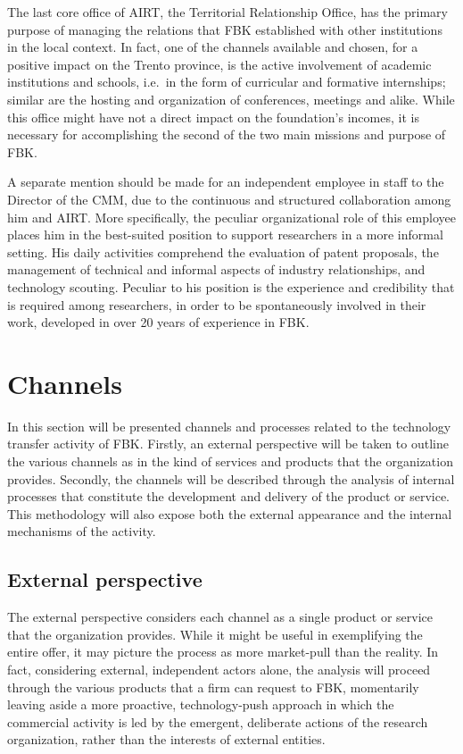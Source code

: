 The last core office of AIRT, the Territorial Relationship Office, has the primary purpose of managing the relations that FBK established with other institutions in the local context. In fact, one of the channels available and chosen, for a positive impact on the Trento province, is the active involvement of academic institutions and schools, i.e.\ in the form of curricular and formative internships; similar are the hosting and organization of conferences, meetings and alike. While this office might have not a direct impact on the foundation's incomes, it is necessary for accomplishing the second of the two main missions and purpose of FBK.

A separate mention should be made for an independent employee in staff to the Director of the CMM, due to the continuous and structured collaboration among him and AIRT. More specifically, the peculiar organizational role of this employee places him in the best-suited position to support researchers in a more informal setting. His daily activities comprehend the evaluation of patent proposals, the management of technical and informal aspects of industry relationships, and technology scouting. Peculiar to his position is the experience and credibility that is required among researchers, in order to be spontaneously involved in their work, developed in over 20 years of experience in FBK.

\section{Channels}

In this section will be presented channels and processes related to the technology transfer activity of FBK. Firstly, an external perspective will be taken to outline the various channels as in the kind of services and products that the organization provides. Secondly, the channels will be described through the analysis of internal processes that constitute the development and delivery of the product or service. This methodology will also expose both the external appearance and the internal mechanisms of the activity. 

\subsection{External perspective}

The external perspective considers each channel as a single product or service that the organization provides. While it might be useful in exemplifying the entire offer, it may picture the process as more market-pull than the reality. In fact, considering external, independent actors alone, the analysis will proceed through the various products that a firm can request to FBK, momentarily leaving aside a more proactive, technology-push approach in which the commercial activity is led by the emergent, deliberate actions of the research organization, rather than the interests of external entities.

